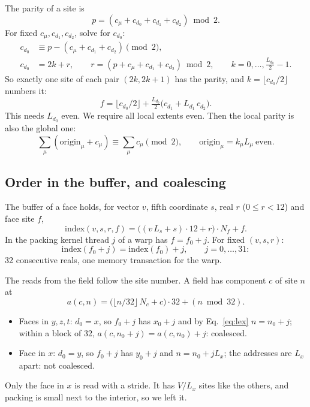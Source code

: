 \documentclass[11pt,a4paper]{article}
\numberwithin{equation}{section}
\begin{document}
The parity of a site is
\begin{equation}
p = (c_\mu + c_{d_0} + c_{d_1} + c_{d_2}) \bmod 2 .
\end{equation}
For fixed $c_\mu,c_{d_1},c_{d_2}$, solve for $c_{d_0}$:
\begin{align}
c_{d_0} &\equiv p - (c_\mu+c_{d_1}+c_{d_2}) \pmod 2,\\
c_{d_0} &= 2k + r,\qquad r = (p + c_\mu+c_{d_1}+c_{d_2})\bmod 2,\qquad k=0,\dots,\tfrac{L_{d_0}}{2}-1 .
\end{align}
So exactly one site of each pair $(2k,2k+1)$ has the parity, and $k=\lfloor c_{d_0}/2\rfloor$
numbers it:
\begin{equation}
f = \lfloor c_{d_0}/2\rfloor + \tfrac{L_{d_0}}{2}\big(c_{d_1} + L_{d_1}\,c_{d_2}\big).
\end{equation}
This needs $L_{d_0}$ even. We require all local extents even. Then the local parity is also the
global one:
\begin{equation}
\sum_\mu (\text{origin}_\mu + c_\mu) \equiv \sum_\mu c_\mu \pmod 2,\qquad
\text{origin}_\mu = k_\mu L_\mu\ \text{even.}
\end{equation}

\subsection{Order in the buffer, and coalescing}

The buffer of a face holds, for vector $v$, fifth coordinate $s$, real $r$ ($0\le r<12$) and face
site $f$,
\begin{equation}
\text{index}(v,s,r,f) = \big((v\,L_s + s)\cdot12 + r\big)\cdot N_f + f .
\end{equation}
In the packing kernel thread $j$ of a warp has $f=f_0+j$. For fixed $(v,s,r)$:
\begin{equation}
\text{index}(f_0+j) = \text{index}(f_0) + j,\qquad j=0,\dots,31:
\end{equation}
32 consecutive reals, one memory transaction for the warp.

The reads from the field follow the site number. A field has component $c$ of site $n$ at
\begin{equation}
a(c,n) = \big(\lfloor n/32\rfloor\,N_c + c\big)\cdot32 + (n\bmod 32).
\end{equation}
\begin{itemize}
\item Faces in $y,z,t$: $d_0=x$, so $f_0+j$ has $x_0+j$ and by Eq.~\eqref{eq:lex} $n=n_0+j$;
within a block of 32, $a(c,n_0+j)=a(c,n_0)+j$: coalesced.
\item Face in $x$: $d_0=y$, so $f_0+j$ has $y_0+j$ and $n=n_0+jL_x$; the addresses are $L_x$
apart: not coalesced.
\end{itemize}
Only the face in $x$ is read with a stride. It has $V/L_x$ sites like the others, and packing is
small next to the interior, so we left it.
\end{document}
